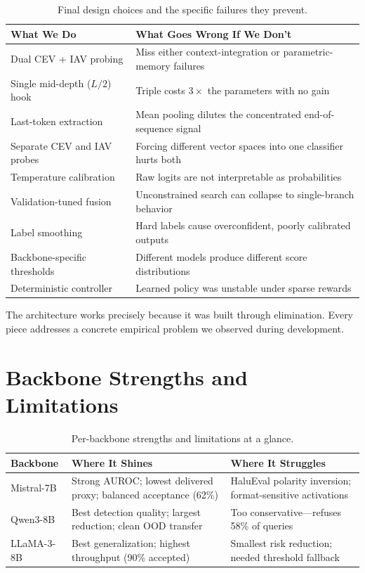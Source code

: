 \begin{table}[!htb]
\centering
\caption{Final design choices and the specific failures they prevent.}
\label{tab:design_choices}
\begin{tabular}{@{}p{5.5cm} p{8cm}@{}}
\toprule
\textbf{What We Do} & \textbf{What Goes Wrong If We Don't} \\
\midrule
Dual CEV + IAV probing & Miss either context-integration or parametric-memory failures \\
Single mid-depth ($L/2$) hook & Triple costs $3\times$ the parameters with no gain \\
Last-token extraction & Mean pooling dilutes the concentrated end-of-sequence signal \\
Separate CEV and IAV probes & Forcing different vector spaces into one classifier hurts both \\
Temperature calibration & Raw logits are not interpretable as probabilities \\
Validation-tuned fusion & Unconstrained search can collapse to single-branch behavior \\
Label smoothing & Hard labels cause overconfident, poorly calibrated outputs \\
Backbone-specific thresholds & Different models produce different score distributions \\
Deterministic controller & Learned policy was unstable under sparse rewards \\
\bottomrule
\end{tabular}
\end{table}

The architecture works precisely because it was built through elimination. Every piece addresses a concrete empirical problem we observed during development.

\section{Backbone Strengths and Limitations}
\label{sec:backbone_strengths}

\begin{table}[!htb]
\centering
\caption{Per-backbone strengths and limitations at a glance.}
\label{tab:backbone_strengths}
\small
\begin{tabular}{@{}l p{5.5cm} p{5.5cm}@{}}
\toprule
\textbf{Backbone} & \textbf{Where It Shines} & \textbf{Where It Struggles} \\
\midrule
Mistral-7B & Strong AUROC; lowest delivered proxy; balanced acceptance (62\%) & HaluEval polarity inversion; format-sensitive activations \\[4pt]
Qwen3-8B & Best detection quality; largest reduction; clean OOD transfer & Too conservative—refuses 58\% of queries \\[4pt]
LLaMA-3-8B & Best generalization; highest throughput (90\% accepted) & Smallest risk reduction; needed threshold fallback \\
\bottomrule
\end{tabular}
\end{table}

